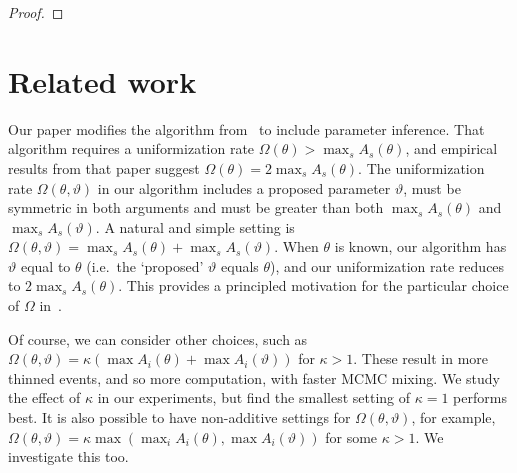 \begin{proof}
\end{proof}

\section{Related work}\label{sec:comments}

Our paper modifies the algorithm from~\citet{RaoTeh13} to include parameter inference.
That algorithm requires a uniformization rate $\Omega(\theta) > \max_s A_s(\theta)$, and empirical results from that paper suggest $\Omega(\theta) = 2\max_s A_s(\theta)$.
The uniformization rate $\Omega(\theta,\vartheta)$ in our algorithm includes a proposed parameter $\vartheta$, must be symmetric in both arguments and must be greater than both $\max_s A_s(\theta)$ and $\max_s A_s(\vartheta)$. 
A natural and simple setting is $\Omega(\theta,\vartheta) = \max_s A_s(\theta) + \max_s A_s(\vartheta)$. 
When $\theta$ is known, our algorithm has $\vartheta$ equal to $\theta$ (i.e.\ the `proposed' $\vartheta$ equals $\theta$), and our uniformization rate reduces to $2\max_s A_s(\theta)$. 
This provides a principled motivation for the particular choice of $\Omega$ in~\citet{RaoTeh13}.

Of course, we can consider other choices, such as $\Omega(\theta,\vartheta) = \kappa(\max A_i(\theta) + \max A_i(\vartheta))$ for $\kappa > 1$.  
These result in more thinned events, and so more computation, with faster MCMC mixing. 
We study the effect of $\kappa$ in our experiments, but find the smallest setting of $\kappa=1$ performs best.
It is also possible to have non-additive settings for $\Omega(\theta,\vartheta)$, for example, $\Omega(\theta,\vartheta) = \kappa \max( \max_i A_i(\theta), \max A_i(\vartheta))$ for some $\kappa > 1$. We investigate this too.

